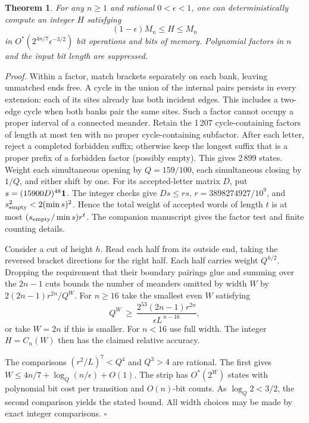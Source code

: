 \documentclass[11pt]{article}
\newenvironment{proof}{\par\noindent\textit{Proof.} }{\unskip\nobreak\hfill\hbox{$\square$}\par}
\newtheorem{theorem}{Theorem}
\begin{document}
\begin{theorem}\label{accuracy}
For any \(n\ge1\) and rational \(0<\epsilon<1\), one can deterministically compute an integer \(H\) satisfying
\[
      (1-\epsilon)M_n\le H\le M_n
\]
in \(O^*(2^{4n/7}\epsilon^{-3/2})\) bit operations and bits of memory. Polynomial factors in \(n\) and the input bit length are suppressed.
\end{theorem}
\begin{proof}
Within a factor, match brackets separately on each bank, leaving unmatched ends free. A cycle in the union of the internal pairs persists in every extension: each of its sites already has both incident edges. This includes a two-edge cycle when both banks pair the same sites. Such a factor cannot occupy a proper interval of a connected meander. Retain the 1\,207 cycle-containing factors of length at most ten with no proper cycle-containing subfactor. After each letter, reject a completed forbidden suffix; otherwise keep the longest suffix that is a proper prefix of a forbidden factor (possibly empty). This gives 2\,899 states. Weight each simultaneous opening by \(Q=159/100\), each simultaneous closing by \(1/Q\), and either shift by one. For its accepted-letter matrix \(D\), put \(s=(15900D)^{48}{\bf1}\). The integer checks give \(Ds\le r s\), \(r=3898274927/10^9\), and \(s_{\rm empty}^2<2(\min s)^2\). Hence the total weight of accepted words of length \(t\) is at most \((s_{\rm empty}/\min s)r^t\). The companion manuscript \cite{halves} gives the factor test and finite counting details.

Consider a cut of height \(h\). Read each half from its outside end, taking the reversed bracket directions for the right half. Each half carries weight \(Q^{h/2}\). Dropping the requirement that their boundary pairings glue and summing over the \(2n-1\) cuts bounds the number of meanders omitted by width \(W\) by \(2(2n-1)r^{2n}/Q^W\). For \(n\ge16\) take the smallest even \(W\) satisfying
\[
 Q^W\ \ge\ \frac{2^{53}(2n-1)r^{2n}}{\epsilon L^{\,n-16}},
\]
or take \(W=2n\) if this is smaller. For \(n<16\) use full width. The integer \(H=C_n(W)\) then has the claimed relative accuracy.

The comparisons \((r^2/L)^7<Q^4\) and \(Q^3>4\) are rational. The first gives \(W\le 4n/7+\log_Q(n/\epsilon)+O(1)\). The strip has \(O^*(2^W)\) states with polynomial bit cost per transition and \(O(n)\)-bit counts. As \(\log_Q2<3/2\), the second comparison yields the stated bound. All width choices may be made by exact integer comparisons.
\end{proof}
\end{document}
